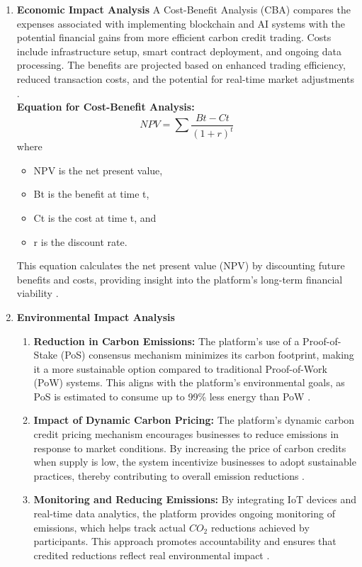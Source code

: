 \documentclass[preprint,12pt]{elsarticle}
\begin{document}
\begin{enumerate}
    \item \textbf{Economic Impact Analysis}
    A Cost-Benefit Analysis (CBA) compares the expenses associated with implementing blockchain and AI systems with the potential financial gains from more efficient carbon credit trading. Costs include infrastructure setup, smart contract deployment, and ongoing data processing. The benefits are projected based on enhanced trading efficiency, reduced transaction costs, and the potential for real-time market adjustments \citep{tapscott2016blockchain}.\\
    \textbf{Equation for Cost-Benefit Analysis:}
    \[NPV = \sum\frac{Bt-Ct}{(1+r)^t}\]
    where
    \begin{itemize}
        \item NPV is the net present value,
\item Bt is the benefit at time t,
\item Ct is the cost at time t, and
\item r is the discount rate.
    \end{itemize}
    This equation calculates the net present value (NPV) by discounting future benefits and costs, providing insight into the platform’s long-term financial viability \citep{perez2002technological}.
    \item \textbf{Environmental Impact Analysis}
    \begin{enumerate}
        \item \textbf{Reduction in Carbon Emissions:}
The platform’s use of a Proof-of-Stake (PoS) consensus mechanism minimizes its carbon footprint, making it a more sustainable option compared to traditional Proof-of-Work (PoW) systems. This aligns with the platform’s environmental goals, as PoS is estimated to consume up to 99\% less energy than PoW \citep{king2012ppcoin}.
\item \textbf{Impact of Dynamic Carbon Pricing:}
The platform’s dynamic carbon credit pricing mechanism encourages businesses to reduce emissions in response to market conditions. By increasing the price of carbon credits when supply is low, the system incentivize businesses to adopt sustainable practices, thereby contributing to overall emission reductions \citep{parikh2022smart}.
\item \textbf{Monitoring and Reducing Emissions:}
By integrating IoT devices and real-time data analytics, the platform provides ongoing monitoring of emissions, which helps track actual $CO_2$ reductions achieved by participants. This approach promotes accountability and ensures that credited reductions reflect real environmental impact \citep{tapscott2016blockchain}.

\end{enumerate}
\end{enumerate}
\end{document}
